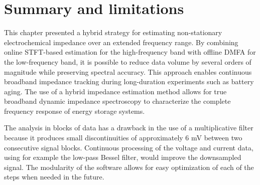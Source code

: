 \section{Summary and limitations}
This chapter presented a hybrid strategy for estimating non-stationary electrochemical impedance over an extended frequency range.
By combining online STFT-based estimation for the high-frequency band with offline DMFA for the low-frequency band, it is possible to reduce data volume by several orders of magnitude while preserving spectral accuracy.
This approach enables continuous broadband impedance tracking during long-duration experiments such as battery aging.
The use of a hybrid impedance estimation method allows for true broadband dynamic impedance spectroscopy to characterize the complete frequency response of energy storage systems.

The analysis in blocks of data has a drawback in the use of a multiplicative filter because it produces small discontinuities of approximately 6 mV between two consecutive signal blocks.
Continuous processing of the voltage and current data, using for example the low-pass Bessel filter, would improve the downsampled signal.
The modularity of the software allows for easy optimization of each of the steps when needed in the future.
